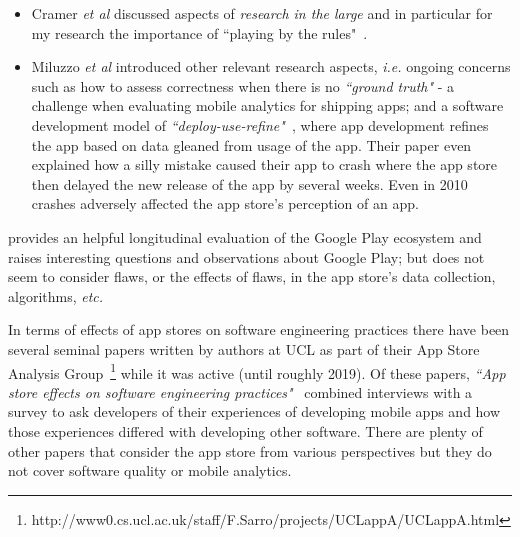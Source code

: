 \begin{itemize}
    \item Cramer \emph{et al} discussed aspects of \emph{research in the large} and in particular for my research the importance of ``playing by the rules"~\cite{cramer2010_research_in_the_large_app_stores}.

    \item Miluzzo \emph{et al} introduced other relevant research aspects, \textit{i.e.}  ongoing concerns such as how to assess correctness when there is no \emph{``ground truth"} - a challenge when evaluating mobile analytics for shipping apps; and a software development model of \textit{``deploy-use-refine"}~\cite{miluzzo2010research_in_the_app_store_era}, where app development refines the app based on data gleaned from usage of the app. Their paper even explained how a silly mistake caused their app to crash where the app store then delayed the new release of the app by several weeks. Even in 2010 crashes adversely affected the app store's perception of an app. %
     
\end{itemize}

\citet{wang2019_understanding_the_evolution_of_mobile_app_ecosystems_a_longitudinal_measurement_of_google_play} provides an helpful longitudinal evaluation of the Google Play ecosystem and raises interesting questions and observations about Google Play; but does not seem to consider flaws, or the effects of flaws, in the app store's data collection, algorithms,\textit{ etc.}

In terms of effects of app stores on software engineering practices there have been several seminal papers written by authors at UCL as part of their App Store Analysis Group~\footnote{http://www0.cs.ucl.ac.uk/staff/F.Sarro/projects/UCLappA/UCLappA.html} while it was active (until roughly 2019). Of these papers, \emph{``App store effects on software engineering practices"}~\citep{alsubaihin2019app_store_effects_on_software_engineering} combined interviews with a survey to ask developers of their experiences of developing mobile apps and how those experiences differed with developing other software. There are plenty of other papers that consider the app store from various perspectives but they do not cover software quality or mobile analytics.


